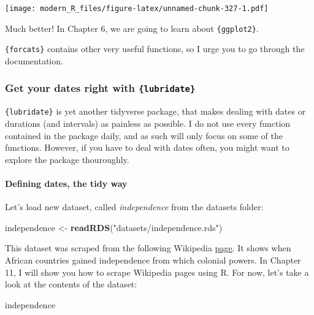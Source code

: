 \documentclass[]{gitbook}
\newenvironment{Shaded}{\begin{snugshade}}{\end{snugshade}}
\newcommand{\KeywordTok}[1]{\textcolor[rgb]{0.13,0.29,0.53}{\textbf{#1}}}
\newcommand{\NormalTok}[1]{#1}
\newcommand{\StringTok}[1]{\textcolor[rgb]{0.31,0.60,0.02}{#1}}
\let\oldparagraph\paragraph
\renewcommand{\paragraph}[1]{\oldparagraph{#1}\mbox{}}
\begin{document}
\texttt{[image: modern\_R\_files/figure-latex/unnamed-chunk-327-1.pdf]}

Much better! In Chapter 6, we are going to learn about \texttt{\{ggplot2\}}.

\texttt{\{forcats\}} contains other very useful functions, so I urge you to go through the documentation.

\hypertarget{get-your-dates-right-with-lubridate}{%
\subsubsection{\texorpdfstring{Get your dates right with \texttt{\{lubridate\}}}{Get your dates right with \{lubridate\}}}\label{get-your-dates-right-with-lubridate}}

\texttt{\{lubridate\}} is yet another tidyverse package, that makes dealing with dates or durations (and intervals) as
painless as possible. I do not use every function contained in the package daily, and as such will
only focus on some of the functions. However, if you have to deal with dates often,
you might want to explore the package thouroughly.

\hypertarget{defining-dates-the-tidy-way}{%
\paragraph{Defining dates, the tidy way}\label{defining-dates-the-tidy-way}}

Let's load new dataset, called \emph{independence} from the datasets folder:

\begin{Shaded}
\begin{Highlighting}[]
\NormalTok{independence <-}\StringTok{ }\KeywordTok{readRDS}\NormalTok{(}\StringTok{"datasets/independence.rds"}\NormalTok{)}
\end{Highlighting}
\end{Shaded}

This dataset was scraped from the following Wikipedia \href{https://en.wikipedia.org/wiki/Decolonisation_of_Africa\#Timeline}{page}.
It shows when African countries gained independence from which colonial powers. In Chapter 11, I
will show you how to scrape Wikipedia pages using R. For now, let's take a look at the contents
of the dataset:

\begin{Shaded}
\begin{Highlighting}[]
\NormalTok{independence}
\end{Highlighting}
\end{Shaded}
\end{document}
